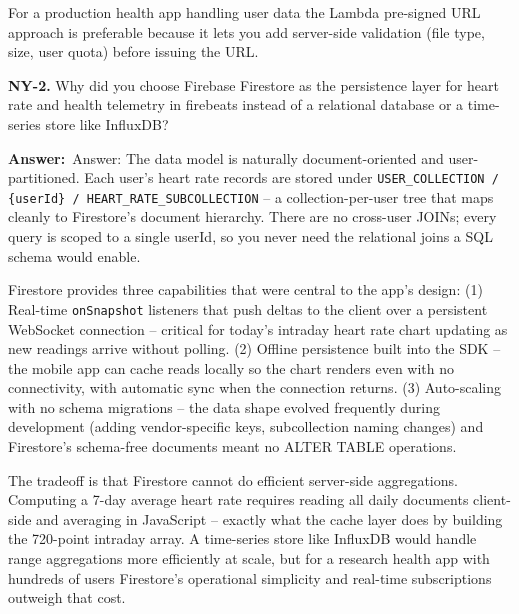 \documentclass[letterpaper,10pt]{article}
\newlength{\boxwidth}
\newcommand{\answerlabel}{\noindent\textbf{\textcolor{answerblue}{Answer:}}~}
\begin{document}
For a production health app handling user data the Lambda pre-signed URL approach is preferable because it lets you add server-side validation (file type, size, user quota) before issuing the URL.

\vspace{6pt}

\colorbox{qbg}{\begin{minipage}{\boxwidth}
\textbf{NY-2.} Why did you choose Firebase Firestore as the persistence layer for heart rate and health telemetry in firebeats instead of a relational database or a time-series store like InfluxDB?
\end{minipage}}

\vspace{2pt}
\answerlabel{Answer:} The data model is naturally document-oriented and user-partitioned. Each user's heart rate records are stored under \texttt{USER\_COLLECTION / \{userId\} / HEART\_RATE\_SUBCOLLECTION} -- a collection-per-user tree that maps cleanly to Firestore's document hierarchy. There are no cross-user JOINs; every query is scoped to a single userId, so you never need the relational joins a SQL schema would enable.

Firestore provides three capabilities that were central to the app's design: (1) Real-time \texttt{onSnapshot} listeners that push deltas to the client over a persistent WebSocket connection -- critical for today's intraday heart rate chart updating as new readings arrive without polling. (2) Offline persistence built into the SDK -- the mobile app can cache reads locally so the chart renders even with no connectivity, with automatic sync when the connection returns. (3) Auto-scaling with no schema migrations -- the data shape evolved frequently during development (adding vendor-specific keys, subcollection naming changes) and Firestore's schema-free documents meant no ALTER TABLE operations.

The tradeoff is that Firestore cannot do efficient server-side aggregations. Computing a 7-day average heart rate requires reading all daily documents client-side and averaging in JavaScript -- exactly what the cache layer does by building the 720-point intraday array. A time-series store like InfluxDB would handle range aggregations more efficiently at scale, but for a research health app with hundreds of users Firestore's operational simplicity and real-time subscriptions outweigh that cost.

\vspace{6pt}
\end{document}
